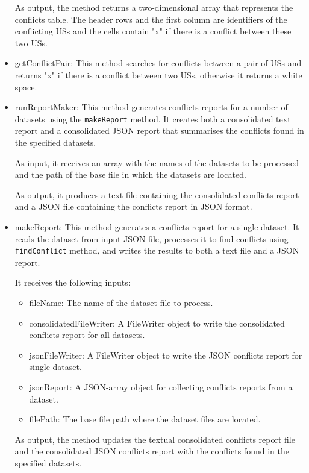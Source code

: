 \begin{itemize}
	As output, the method returns a two-dimensional array that represents the conflicts table. The header rows and the first column are identifiers of the conflicting USs and the cells contain "x" if there is a conflict between these two USs.
	
	\item getConflictPair: This method searches for conflicts between a pair of USs and returns "x" if there is a conflict between two USs, otherwise it returns a white space.
	
	\item runReportMaker: This method generates conflicts reports for a number of datasets using the \texttt{makeReport} method. It creates both a consolidated text report and a consolidated JSON report that summarises the conflicts found in the specified datasets.
	
	As input, it receives an array with the names of the datasets to be processed and the path of the base file in which the datasets are located.
	
	As output, it produces a text file containing the consolidated conflicts report and a JSON file containing the conflicts report in JSON format.
	
	\item makeReport: This method generates a conflicts report for a single dataset. It reads the dataset from input JSON file, processes it to find conflicts using \texttt{findConflict} method, and writes the results to both a text file and a JSON report.
	
	It receives the following inputs:
	\begin{itemize}
		\item fileName: The name of the dataset file to process.
		
		\item consolidatedFileWriter: A FileWriter object to write the consolidated conflicts report for all datasets.
		
		\item jsonFileWriter: A FileWriter object to write the JSON conflicts report for single dataset.
		
		\item jsonReport: A JSON-array object for collecting conflicts reports from a dataset.
		
		\item filePath: The base file path where the dataset files are located.
		
	\end{itemize}
	As output, the method updates the textual consolidated conflicts report file and the consolidated JSON conflicts report with the conflicts found in the specified datasets.
	

\end{itemize}
